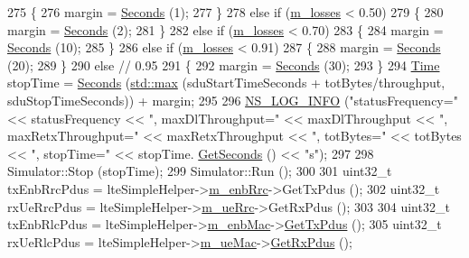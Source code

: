 \begin{DoxyCode}
275     \{
276       margin = \hyperlink{group__timecivil_ga33c34b816f8ff6628e33d5c8e9713b9e}{Seconds} (1);
277     \}
278   \textcolor{keywordflow}{else} \textcolor{keywordflow}{if} (\hyperlink{classLteRlcAmE2eTestCase_afbb72ea6f3599c57b19be03be5e43878}{m\_losses} < 0.50)
279     \{
280       margin = \hyperlink{group__timecivil_ga33c34b816f8ff6628e33d5c8e9713b9e}{Seconds} (2);
281     \}
282   \textcolor{keywordflow}{else} \textcolor{keywordflow}{if} (\hyperlink{classLteRlcAmE2eTestCase_afbb72ea6f3599c57b19be03be5e43878}{m\_losses} < 0.70)
283     \{
284       margin = \hyperlink{group__timecivil_ga33c34b816f8ff6628e33d5c8e9713b9e}{Seconds} (10);
285     \}
286   \textcolor{keywordflow}{else} \textcolor{keywordflow}{if} (\hyperlink{classLteRlcAmE2eTestCase_afbb72ea6f3599c57b19be03be5e43878}{m\_losses} < 0.91)
287     \{
288       margin = \hyperlink{group__timecivil_ga33c34b816f8ff6628e33d5c8e9713b9e}{Seconds} (20);
289     \}
290   \textcolor{keywordflow}{else} \textcolor{comment}{// 0.95}
291     \{
292       margin = \hyperlink{group__timecivil_ga33c34b816f8ff6628e33d5c8e9713b9e}{Seconds} (30);
293     \}
294   \hyperlink{classns3_1_1Time}{Time} stopTime = \hyperlink{group__timecivil_ga33c34b816f8ff6628e33d5c8e9713b9e}{Seconds} (\hyperlink{80211b_8c_affe776513b24d84b39af8ab0930fef7f}{std::max} (sduStartTimeSeconds + totBytes/throughput, 
      sduStopTimeSeconds)) + margin;
295   
296   \hyperlink{group__logging_gafbd73ee2cf9f26b319f49086d8e860fb}{NS\_LOG\_INFO} (\textcolor{stringliteral}{"statusFrequency="} << statusFrequency << \textcolor{stringliteral}{", maxDlThroughput="} << maxDlThroughput 
      << \textcolor{stringliteral}{", maxRetxThroughput="} << maxRetxThroughput << \textcolor{stringliteral}{", totBytes="} << totBytes << \textcolor{stringliteral}{", stopTime="} << stopTime.
      \hyperlink{classns3_1_1Time_a8f20d5c3b0902d7b4320982f340b57c8}{GetSeconds} () << \textcolor{stringliteral}{"s"});
297   
298   Simulator::Stop (stopTime);
299   Simulator::Run ();
300 
301   uint32\_t txEnbRrcPdus = lteSimpleHelper->\hyperlink{classns3_1_1LteSimpleHelper_a89ce7ea3468b4cbea029490a6451052e}{m\_enbRrc}->GetTxPdus ();
302   uint32\_t rxUeRrcPdus = lteSimpleHelper->\hyperlink{classns3_1_1LteSimpleHelper_a21a115de62aaa22c3278c1154057b5f2}{m\_ueRrc}->GetRxPdus ();
303 
304   uint32\_t txEnbRlcPdus = lteSimpleHelper->\hyperlink{classns3_1_1LteSimpleHelper_a953ff7bc15f6b310a13d35581c2fecef}{m\_enbMac}->\hyperlink{classns3_1_1LteTestMac_a04d893d376960c0fc0adbc982b32c0cc}{GetTxPdus} ();
305   uint32\_t rxUeRlcPdus = lteSimpleHelper->\hyperlink{classns3_1_1LteSimpleHelper_a963987a7323f3f7b1cefbc0e0bc367bc}{m\_ueMac}->\hyperlink{classns3_1_1LteTestMac_ab2ba8d5fc32e1327e353330fac2ffdea}{GetRxPdus} ();

\end{DoxyCode}
